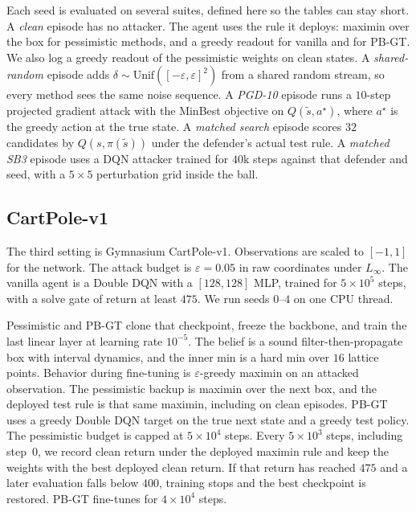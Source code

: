 \documentclass[10pt,twocolumn]{article}
\begin{document}
Each seed is evaluated on several suites, defined here so the tables can stay short.
A \emph{clean} episode has no attacker.
The agent uses the rule it deploys: maximin over the box for pessimistic methods, and a greedy readout for vanilla and for PB-GT.
We also log a greedy readout of the pessimistic weights on clean states.
A \emph{shared-random} episode adds $\delta\sim\mathrm{Unif}([-\varepsilon,\varepsilon]^2)$ from a shared random stream, so every method sees the same noise sequence.
A \emph{PGD-10} episode runs a $10$-step projected gradient attack with the MinBest objective on $Q(\tilde s, a^\star)$, where $a^\star$ is the greedy action at the true state.
A \emph{matched search} episode scores $32$ candidates by $Q(s,\pi(\tilde s))$ under the defender's actual test rule.
A \emph{matched SB3} episode uses a DQN attacker trained for $40$k steps against that defender and seed, with a $5{\times}5$ perturbation grid inside the ball.

\subsection{CartPole-v1}
\label{sec:cp-setup}

The third setting is Gymnasium CartPole-v1.
Observations are scaled to $[-1,1]$ for the network.
The attack budget is $\varepsilon{=}0.05$ in raw coordinates under $L_\infty$.
The vanilla agent is a Double DQN with a $[128,128]$ MLP, trained for $5{\times}10^5$ steps, with a solve gate of return at least $475$.
We run seeds $0$--$4$ on one CPU thread.

Pessimistic and PB-GT clone that checkpoint, freeze the backbone, and train the last linear layer at learning rate $10^{-5}$.
The belief is a sound filter-then-propagate box with interval dynamics, and the inner min is a hard min over $16$ lattice points.
Behavior during fine-tuning is $\varepsilon$-greedy maximin on an attacked observation.
The pessimistic backup is maximin over the next box, and the deployed test rule is that same maximin, including on clean episodes.
PB-GT uses a greedy Double DQN target on the true next state and a greedy test policy.
The pessimistic budget is capped at $5{\times}10^4$ steps.
Every $5{\times}10^3$ steps, including step~$0$, we record clean return under the deployed maximin rule and keep the weights with the best deployed clean return.
If that return has reached $475$ and a later evaluation falls below $400$, training stops and the best checkpoint is restored.
PB-GT fine-tunes for $4{\times}10^4$ steps.
\end{document}
